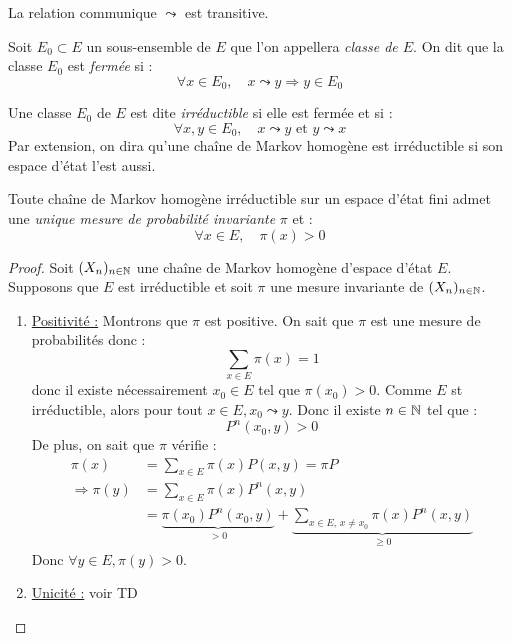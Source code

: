 \begin{prop}[Transitivité]
    La relation communique $ \leadsto$ est transitive. 
\end{prop}

\begin{definition}
    Soit $E_0 \subset E$ un sous-ensemble de $E$ que l'on appellera \emph{classe de $E$}. 
    On dit que la classe $E_0$ est \emph{fermée} si : 
        $$ \forall x \in E_0, \quad x \leadsto y \Longrightarrow y \in E_0 $$ 
\end{definition}

\begin{definition}
    Une classe $E_0$ de $E$ est dite \emph{irréductible} si elle est fermée et si : 
        $$ \forall x,y \in E_0, \quad x \leadsto y \text{ et } y \leadsto x $$ 
    Par extension, on dira qu'une chaîne de Markov homogène est irréductible si son espace d'état l'est aussi. 
\end{definition}

\begin{theorem}
    Toute chaîne de Markov homogène irréductible sur un espace d'état fini admet une \emph{unique mesure de probabilité 
    invariante} $ \pi$ et : 
        $$ \forall x \in E, \quad \pi(x) > 0 $$
\end{theorem}

\begin{proof}
    Soit $(X_n)_{n \in \mathbb{N}}$ une chaîne de Markov homogène d'espace d'état $E$. 
    Supposons que $E$ est irréductible et soit $ \pi$ une mesure invariante de $(X_n)_{n \in \mathbb{N}}$. 
    \begin{enumerate}
        \item \underline{Positivité :} Montrons que $ \pi$ est positive. On sait que $ \pi$ est une 
        mesure de probabilités donc : 
            $$ \sum_{x \in E} \pi(x) = 1 $$ 
        donc il existe nécessairement $x_0 \in E$ tel que $ \pi(x_0) > 0$. Comme $E$ st irréductible, 
        alors pour tout $x \in E, x_0 \leadsto y$. Donc il existe $ n \in \mathbb{N}$ tel que : 
            $$ P^n(x_0, y) > 0$$ 
        De plus, on sait que $ \pi$ vérifie : 
            \begin{align*}
                \pi(x) &= \sum_{x \in E} \pi(x) P(x,y) = \pi P \\ 
                \Longrightarrow \pi(y) &= \sum_{x \in E} \pi(x) P^n(x,y) \\ 
                &= \underbrace{\pi(x_0) P^n(x_0, y)}_{>0}
                + \underbrace{\sum_{x \in E, \, x \not= x_0} \pi(x) P^n(x,y)}_{\geqslant 0}
            \end{align*}
        Donc $ \forall y \in E, \pi(y) > 0$. 
        \item \underline{Unicité :} voir TD
    \end{enumerate}
\end{proof}


